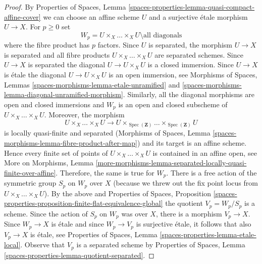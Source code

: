 \documentclass{stacks-project}
\theoremstyle{plain}
\theoremstyle{definition}
\theoremstyle{remark}
\numberwithin{equation}{subsection}
\def\Spec{\mathop{\mathrm{Spec}}}
\begin{document}
\begin{proof}
By Properties of Spaces, Lemma
\ref{spaces-properties-lemma-quasi-compact-affine-cover}
we can choose an affine scheme $U$ and a surjective \'etale morphism
$U \to X$. For $p \geq 0$ set
$$
W_p = U \times_X \ldots \times_X U \setminus \text{all diagonals}
$$
where the fibre product has $p$ factors. Since $U$ is separated,
the morphism $U \to X$ is separated and all fibre products
$U \times_X \ldots \times_X U$ are separated schemes. Since $U \to X$ is
separated the diagonal $U \to U \times_X U$ is a closed immersion. Since
$U \to X$ is \'etale the diagonal $U \to U \times_X U$ is an open
immersion, see Morphisms of Spaces, Lemmas
\ref{spaces-morphisms-lemma-etale-unramified} and
\ref{spaces-morphisms-lemma-diagonal-unramified-morphism}.
Similarly, all the diagonal morphisms are open and closed immersions and
$W_p$ is an open and closed subscheme of $U \times_X \ldots \times_X U$.
Moreover, the morphism
$$
U \times_X \ldots \times_X U \longrightarrow
U \times_{\Spec(\mathbf{Z})} \ldots \times_{\Spec(\mathbf{Z})} U
$$
is locally quasi-finite and separated (Morphisms of Spaces,
Lemma \ref{spaces-morphisms-lemma-fibre-product-after-map})
and its target is an affine scheme. Hence every finite set of points of
$U \times_X \ldots \times_X U$ is contained in an affine open, see
More on Morphisms, Lemma
\ref{more-morphisms-lemma-separated-locally-quasi-finite-over-affine}.
Therefore, the same is true for $W_p$.
There is a free action of the symmetric group $S_p$ on $W_p$ over $X$
(because we threw out the fix point locus from
$U \times_X \ldots \times_X U$). By the above and
Properties of Spaces, Proposition
\ref{spaces-properties-proposition-finite-flat-equivalence-global}
the quotient $V_p = W_p/S_p$ is a scheme. Since the action of
$S_p$ on $W_p$ was over $X$, there is a morphism $V_p \to X$.
Since $W_p \to X$ is \'etale and since $W_p \to V_p$ is surjective
\'etale, it follows that also $V_p \to X$ is \'etale, see
Properties of Spaces, Lemma \ref{spaces-properties-lemma-etale-local}.
Observe that $V_p$ is a separated scheme by
Properties of Spaces, Lemma
\ref{spaces-properties-lemma-quotient-separated}.


\end{proof}
\end{document}
